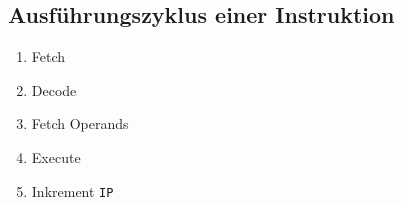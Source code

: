 \subsection[Ausführungszyklus]{Ausführungszyklus einer Instruktion}
\label{subsec:Ausfuehrungszyklus}

\begin{enumerate}
 \item Fetch
 \item Decode
 \item Fetch Operands
 \item Execute
 \item Inkrement \texttt{IP}
\end{enumerate}


